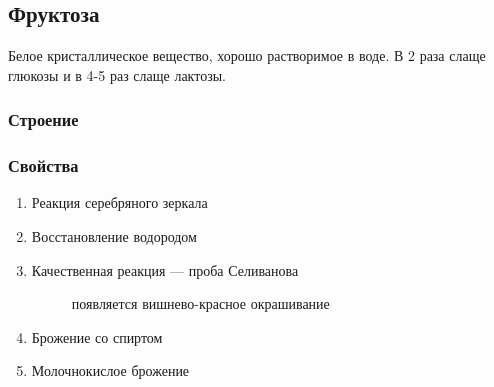 \documentclass[12pt]{article}
\begin{document}
\pagestyle{empty}
\subsection*{Фруктоза}

Белое кристаллическое вещество, хорошо растворимое в воде.
В 2 раза слаще глюкозы и в 4-5 раз слаще лактозы.

\subsubsection*{Строение}
\begin{center}
\end{center}

\subsubsection*{Свойства}
\begin{enumerate}
    \item Реакция серебряного зеркала
    \item Восстановление водородом
    \item Качественная реакция --- проба Селиванова
          \begin{figure}[!h]
              \centering
              \def\svgwidth{\columnwidth}
              
              \raggedleft
              появляется вишнево-красное окрашивание
          \end{figure}
    \item Брожение со спиртом \\
    \item Молочнокислое брожение \\

\end{enumerate}
\end{document}
